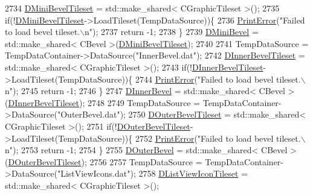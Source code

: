 \begin{DoxyCode}
2734     \hyperlink{classCApplicationData_a74527a373eef061540615e61928f9706}{DMiniBevelTileset} = std::make\_shared< CGraphicTileset >();
2735     \textcolor{keywordflow}{if}(!\hyperlink{classCApplicationData_a74527a373eef061540615e61928f9706}{DMiniBevelTileset}->LoadTileset(TempDataSource))\{
2736         \hyperlink{Debug_8h_a2ed825eefefe35baf59a93a8c641323d}{PrintError}(\textcolor{stringliteral}{"Failed to load bevel tileset.\(\backslash\)n"});
2737         \textcolor{keywordflow}{return} -1;
2738     \}        
2739     \hyperlink{classCApplicationData_ad6718b216878d9fe05b26cd24b89c6ee}{DMiniBevel} = std::make\_shared< CBevel >(\hyperlink{classCApplicationData_a74527a373eef061540615e61928f9706}{DMiniBevelTileset});
2740     
2741     TempDataSource = TempDataContainer->DataSource(\textcolor{stringliteral}{"InnerBevel.dat"});
2742     \hyperlink{classCApplicationData_ae62d58d93397422437d8f50acfca23e6}{DInnerBevelTileset} = std::make\_shared< CGraphicTileset >();
2743     \textcolor{keywordflow}{if}(!\hyperlink{classCApplicationData_ae62d58d93397422437d8f50acfca23e6}{DInnerBevelTileset}->LoadTileset(TempDataSource))\{
2744         \hyperlink{Debug_8h_a2ed825eefefe35baf59a93a8c641323d}{PrintError}(\textcolor{stringliteral}{"Failed to load bevel tileset.\(\backslash\)n"});
2745         \textcolor{keywordflow}{return} -1;
2746     \}        
2747     \hyperlink{classCApplicationData_a29a687c44dceb9e87a56d96612d59ab5}{DInnerBevel} = std::make\_shared< CBevel >(\hyperlink{classCApplicationData_ae62d58d93397422437d8f50acfca23e6}{DInnerBevelTileset});
2748     
2749     TempDataSource = TempDataContainer->DataSource(\textcolor{stringliteral}{"OuterBevel.dat"});
2750     \hyperlink{classCApplicationData_ac1ebf4e2d6c8a445c7e8de643a348093}{DOuterBevelTileset} = std::make\_shared< CGraphicTileset >();
2751     \textcolor{keywordflow}{if}(!\hyperlink{classCApplicationData_ac1ebf4e2d6c8a445c7e8de643a348093}{DOuterBevelTileset}->LoadTileset(TempDataSource))\{
2752         \hyperlink{Debug_8h_a2ed825eefefe35baf59a93a8c641323d}{PrintError}(\textcolor{stringliteral}{"Failed to load bevel tileset.\(\backslash\)n"});
2753         \textcolor{keywordflow}{return} -1;
2754     \}        
2755     \hyperlink{classCApplicationData_abc2b04aa05148da81145ff6d6bc2bf01}{DOuterBevel} = std::make\_shared< CBevel >(\hyperlink{classCApplicationData_ac1ebf4e2d6c8a445c7e8de643a348093}{DOuterBevelTileset});
2756     
2757     TempDataSource = TempDataContainer->DataSource(\textcolor{stringliteral}{"ListViewIcons.dat"});
2758     \hyperlink{classCApplicationData_ab00db57ca7c624d026ed1fc108bc5b38}{DListViewIconTileset} = std::make\_shared< CGraphicTileset >();

\end{DoxyCode}
